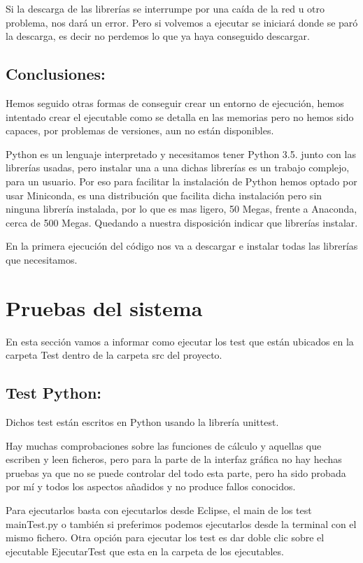 Si la descarga de las librerías se interrumpe por una caída de la red u otro problema, nos dará un error. Pero si volvemos a ejecutar se iniciará donde se paró la descarga, es decir no perdemos lo que ya haya conseguido descargar.


\subsection{Conclusiones:}
Hemos seguido otras formas de conseguir crear un entorno de ejecución, hemos intentado crear el ejecutable como se detalla en las memorias pero no hemos sido capaces, por problemas de versiones, aun no están disponibles.

Python es un lenguaje interpretado y necesitamos tener Python 3.5. junto con las librerías usadas, pero instalar una a una dichas librerías es un trabajo complejo, para un usuario. Por eso para facilitar la instalación de Python hemos optado por usar Miniconda, es una distribución que facilita dicha instalación pero sin ninguna librería instalada, por lo que es mas ligero, 50 Megas, frente a Anaconda, cerca de 500 Megas. Quedando a nuestra disposición indicar que librerías instalar.

En la primera ejecución del código nos va a descargar e instalar todas las librerías que necesitamos.

\section{Pruebas del sistema}
En esta sección vamos a informar como ejecutar los test que están ubicados en la carpeta Test dentro de la carpeta src del proyecto. 

\subsection{Test Python:}
Dichos test están escritos en Python usando la librería unittest.

Hay muchas comprobaciones sobre las funciones de cálculo y aquellas que escriben y leen ficheros, pero para la parte de la interfaz gráfica no hay hechas pruebas ya que no se puede controlar del todo esta parte, pero ha sido probada por mí y todos los aspectos añadidos y no produce fallos conocidos.

Para ejecutarlos basta con ejecutarlos desde Eclipse, el main de los test mainTest.py o también si preferimos podemos ejecutarlos desde la terminal con el mismo fichero.
Otra opción para ejecutar los test es dar doble clic sobre el ejecutable EjecutarTest que esta en la carpeta de los ejecutables. 


